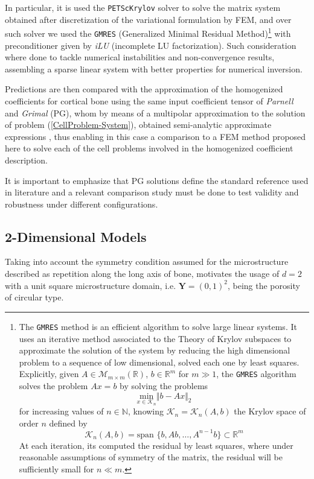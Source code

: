 In particular, it is used the \texttt{PETScKrylov} solver to solve the matrix system obtained after discretization of the variational formulation by FEM, and over such solver we used the \texttt{GMRES} (Generalized Minimal Residual Method)\footnote{The \texttt{GMRES} method is an efficient algorithm to solve large linear systems. It uses an iterative method associated to the Theory of Krylov subspaces to approximate the solution of the system by reducing the high dimensional problem to a sequence of low dimensional, solved each one by least squares.
Explicitly, given $A \in \mathcal{M}_{m\times m} (\mathbb{R})$, $b \in \mathbb{R}^m$ for $m\gg 1$, the \texttt{GMRES} algorithm solves the problem $A x = b$ by solving the problems 
\begin{equation*}
    \underset{x \in \mathcal{K}_n}{\text{ min }} \Vert b - Ax \Vert_2   
\end{equation*} 
for increasing values of $n \in \mathbb{N}$, knowing $\mathcal{K}_n = \mathcal{K}_n(A,b)$ the Krylov space of order $n$ defined by
\begin{equation*}
 \mathcal{K}_n(A,b) = \text{span }\{ b, Ab, \dots, A^{n-1}b \} \subset \mathbb{R}^m   
\end{equation*}
At each iteration, its computed the residual by least squares, where under reasonable assumptions of symmetry of the matrix, the residual will be sufficiently small for $n \ll m$.} with preconditioner given by \textit{iLU} (incomplete LU factorization). Such consideration where done to tackle numerical instabilities and non-convergence results, assembling a sparse linear system with better properties for numerical inversion.

Predictions are then compared with the approximation of the homogenized coefficients for cortical bone using the same input coefficient tensor of \textit{Parnell} and \textit{Grimal} (PG), whom by means of a multipolar approximation to the solution of problem (\ref{CellProblem-System}), obtained semi-analytic approximate expressions \cite{Parnell2008}, thus enabling in this case a comparison to a FEM method proposed here to solve each of the cell problems involved in the homogenized coefficient description. 

It is important to emphasize that PG solutions define the standard reference used in literature and a relevant comparison study must be done to test validity and robustness under different configurations.

\subsection{2-Dimensional Models}
Taking into account the symmetry condition assumed for the microstructure described as repetition along the long axis of bone, motivates the usage of $d = 2$ with a unit square microstructure domain, i.e. $\mathbf{Y} = (0,1)^2$, being the porosity of circular type.

